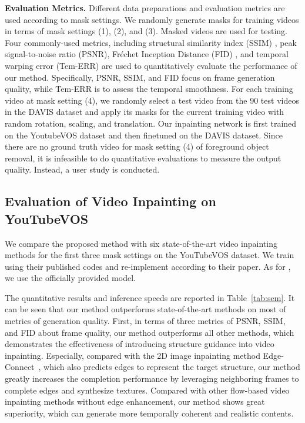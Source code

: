 \noindent \textbf{Evaluation Metrics.} 
Different data preparations and evaluation metrics are used according to mask settings. We randomly generate masks for training videos in terms of mask settings (1), (2), and (3). 
Masked videos are used for testing.
Four commonly-used metrics, including structural similarity index (SSIM) \cite{wang2004image}, peak signal-to-noise ratio (PSNR), Fr{\'e}chet Inception Distance (FID) \cite{heusel2017gans}, and temporal warping error (Tem-ERR) \cite{Kim_2019_CVPR} are used to quantitatively evaluate the performance of our method. 
{\color{blue}Specifically, PSNR, SSIM, and FID focus on frame generation quality, while Tem-ERR is to assess the temporal smoothness.} 
For each training video at mask setting (4), we randomly select a test video from the 90 test videos in the DAVIS dataset and apply its masks for the current training video with random rotation, scaling, and translation.
Our inpainting network is first trained on the YoutubeVOS dataset and then finetuned on the DAVIS dataset. 
Since there are no ground truth video for mask setting (4) of foreground object removal, it is infeasible to do quantitative evaluations to measure the output quality. Instead, a user study is conducted.  




\subsection{Evaluation of Video Inpainting on YouTubeVOS}
We compare the proposed method with six state-of-the-art video inpainting methods \cite{nazeri2019edgeconnect,wang2019video,Kim_2019_CVPR1,Xu_2019_CVPR,lee2019copy,oh2019onion}
for the first three mask settings on the YouTubeVOS dataset.
%
We train \cite{nazeri2019edgeconnect,Xu_2019_CVPR} using their published codes and re-implement \cite{wang2019video} according to their paper. As for \cite{Kim_2019_CVPR1,lee2019copy,oh2019onion}, we use the officially provided model.


The quantitative results and inference speeds are reported in Table~\ref{tab:sem}.
It can be seen that our method outperforms state-of-the-art methods on most of metrics of generation quality.
First, in terms of three metrics of PSNR, SSIM, and FID about frame quality, our method outperforms all other methods, which demonstrates the effectiveness of introducing structure guidance into video inpainting.
Especially, compared with the 2D image inpainting method Edge-Connect~\cite{nazeri2019edgeconnect}, which also predicts edges to represent the target structure, our method greatly increases the completion performance by leveraging neighboring frames to complete edges and synthesize textures. 
Compared with other flow-based video inpainting methods without edge enhancement, our method shows great superiority, which can generate more temporally coherent and realistic contents. 

